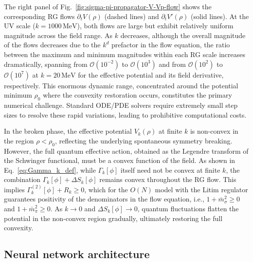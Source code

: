 \documentclass[reprint,twocolumn,superscriptaddress,preprintnumbers,amsmath,amssymb,aps,prd,floatfix]{revtex4-2}
\def\Eq#1{Eq.~\eqref{#1}}
\def\Fig#1{Fig.~\ref{#1}}
\begin{document}
The right panel of \Fig{fig:sigma-pi-propagator-V-Vp-flow} shows the corresponding RG flows $\partial_t V(\rho)$ (dashed lines) and $\partial_t V'(\rho)$ (solid lines). At the UV scale ($k=1000\,\mathrm{MeV}$), both flows are large but exhibit relatively uniform magnitude across the field range. As $k$ decreases, although the overall magnitude of the flows decreases due to the $k^d$ prefactor in the flow equation, the ratio between the maximum and minimum magnitudes within each RG scale increases dramatically, spanning from $\mathcal{O}(10^{-2})$ to $\mathcal{O}(10^{3})$ and from $\mathcal{O}(10^2)$ to $\mathcal{O}(10^{7})$ at $k=20\,\mathrm{MeV}$ for the effective potential and its field derivative, respectively. This enormous dynamic range, concentrated around the potential minimum $\rho_0$ where the convexity restoration occurs, constitutes the primary numerical challenge. Standard ODE/PDE solvers require extremely small step sizes to resolve these rapid variations, leading to prohibitive computational costs.

In the broken phase, the effective potential $V_k(\rho)$ at finite $k$ is non-convex in the region $\rho < \rho_0$, reflecting the underlying spontaneous symmetry breaking. However, the full quantum effective action, obtained as the Legendre transform of the Schwinger functional, must be a convex function of the field. As shown in \Eq{eq:Gamma_k_def}, while $\Gamma_k[\phi]$ itself need not be convex at finite $k$, the combination $\Gamma_k[\phi]+\Delta S_k[\phi]$ remains convex throughout the RG flow. This implies $\Gamma^{(2)}_k[\phi]+R_k\geq 0$, which for the $O(N)$ model with the Litim regulator guarantees positivity of the denominators in the flow equation, i.e., $1+\bar{m}_\sigma^2\geq 0$ and $1+\bar{m}_\pi^2\geq 0$. As $k\to 0$ and $\Delta S_k[\phi] \to 0$, quantum fluctuations flatten the potential in the non-convex region gradually, ultimately restoring the full convexity.

\subsection{Neural network architecture}
\end{document}
